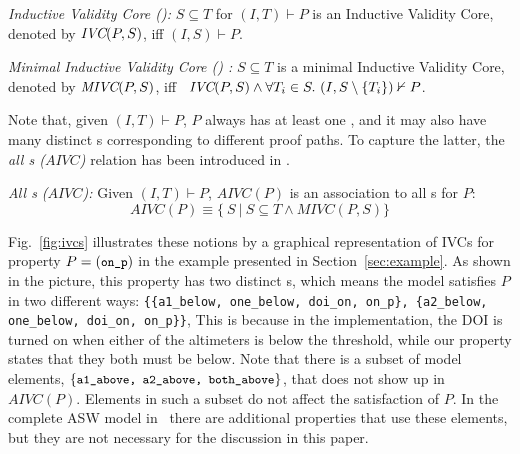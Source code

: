 \begin{definition}{\emph{Inductive Validity Core (\ivc)\cite{Ghass16}:}}
  \label{def:ivc}
  $S \subseteq T$ for $(I, T)\vdash P$ is an Inductive Validity Core,
  denoted by $\textit{IVC}(P, S)$, iff $(I, S) \vdash P $.
\end{definition}

\begin{definition}{\emph{Minimal Inductive Validity Core (\mivc) \cite{Ghass16}:}}
  \label{def:minimal-ivc}
  $S \subseteq T$ is a minimal Inductive Validity Core,
  denoted by $\textit{MIVC}(P, S)$, iff ~$\textit{IVC}(P, S) \wedge \forall T_i \in S.~ (I, S\setminus\{ T_i \}) \nvdash P$.
\end{definition}


Note that, given $(I, T) \vdash P$, $P$ always has at least one \mivc, and it may also have many distinct \mivc s corresponding to different proof paths. To capture the latter, the \emph{all \mivc s ($AIVC$)} relation has been introduced in \cite{Murugesan16:renext}.
\begin{definition}{\emph{All \mivc s ($AIVC$):}}
    \label{def:allivcs}
    Given $(I, T) \vdash P$, $AIVC(P)$ is an association to all \mivc s for $P$:
    $$ AIVC(P) \equiv  \{\ S~|~S \subseteq T \land  MIVC(P, S)\} $$
\end{definition}

Fig.~\ref{fig:ivcs} illustrates these notions by a graphical representation of IVCs for property $P = (\small{\texttt{on\_p}})$ in the example presented in Section~\ref{sec:example}. As shown in the picture, this property has two distinct \mivc s, which means the model satisfies $P$ in two different ways:  \texttt{\{\{a1\_below, one\_below, doi\_on, on\_p\}, \{a2\_below, one\_below, doi\_on, on\_p\}\}}, This is because in the implementation, the DOI is turned on when either of the altimeters is below the threshold, while our property states that they both must be below.
Note that there is a subset of model elements, $\{{\small \texttt{a1\_above, a2\_above, both\_above}}\}$, that does not show up in $AIVC(P)$. Elements in such a subset
do not affect the satisfaction of $P$.  In the complete ASW model in~\cite{HCW02:ase-deviation} there are additional properties that use these elements, but they are not necessary for the discussion in this paper.   

